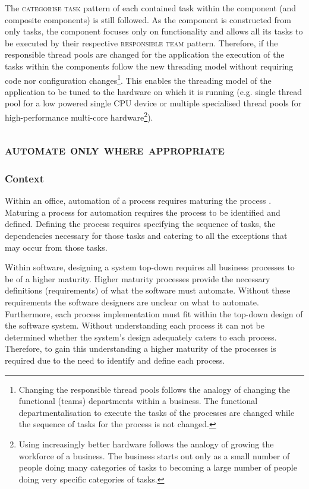 \documentclass[prodmode]{style/acmlarge}
\begin{document}
The \textsc{categorise task} pattern of each contained task within the component
(and composite components) is still followed.  As the component is constructed from
only tasks, the component focuses only on functionality and allows all its tasks
to be executed by their respective \textsc{responsible team} pattern.
Therefore, if the responsible thread pools are changed for the application the
execution of the tasks within the components follow the new threading model
without requiring code nor configuration changes\footnote{Changing the
responsible thread pools follows the analogy of changing the functional (teams)
departments within a business.  The functional departmentalisation to execute
the tasks of the processes are changed while the sequence of tasks for the
process is not changed.}.  This enables the threading model of the application
to be tuned to the hardware on which it is running (e.g. single thread pool for a low
powered single CPU device or multiple specialised thread pools for
high-performance multi-core hardware\footnote{Using increasingly better hardware
follows the analogy of growing the workforce of a business.  The business starts
out only as a small number of people doing many categories of tasks to becoming
a large number of people doing very specific categories of tasks.}).



\subsection{\textsc{\textbf{automate only where appropriate}}}

\subsubsection*{Context} Within an office, automation of a process requires
maturing the process \cite{process-maturity-global,bpm-tools}.  Maturing a
process for automation requires the process to be identified and defined. 
Defining the process requires specifying the sequence of tasks, the dependencies
necessary for those tasks and catering to all the exceptions that may occur from
those tasks.

Within software, designing a system top-down requires all business processes to
be of a higher maturity.  Higher maturity processes provide the necessary
definitions (requirements) of what the software must automate.  Without these
requirements the software designers are unclear on what to automate.
Furthermore, each process implementation must fit within the top-down design of
the software system.  Without understanding each process it can not be
determined whether the system's design adequately caters to each process.
Therefore, to gain this understanding a higher maturity of the processes is
required due to the need to identify and define each process.
\end{document}
